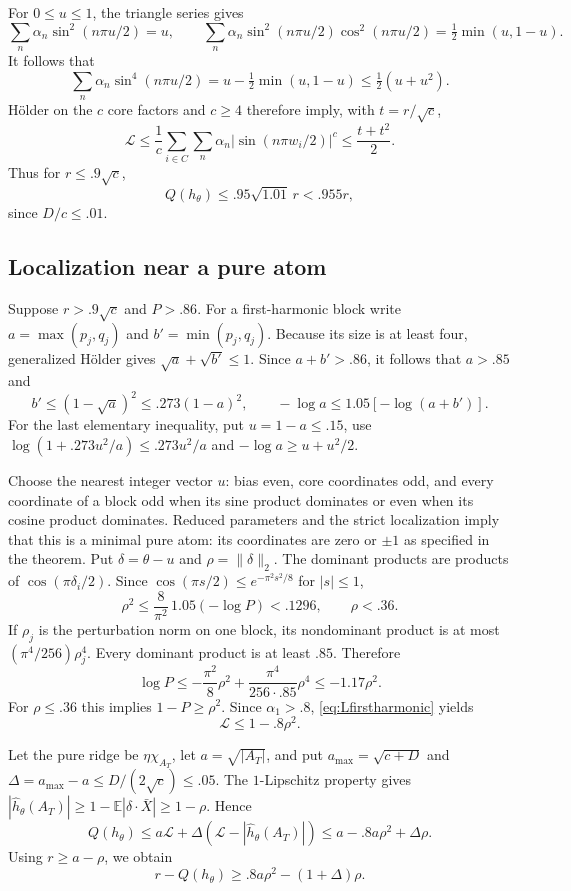 \documentclass[11pt]{article}
\newcommand{\E}{\mathbb E}
\begin{document}
For $0\le u\le1$, the triangle series gives
\[
 \sum_n\alpha_n\sin^2(n\pi u/2)=u,\qquad
 \sum_n\alpha_n\sin^2(n\pi u/2)\cos^2(n\pi u/2)
                  =\tfrac12\min(u,1-u).
\]
It follows that
\[
 \sum_n\alpha_n\sin^4(n\pi u/2)
    =u-\tfrac12\min(u,1-u)\le\tfrac12(u+u^2).
\]
H\"older on the $c$ core factors and $c\ge4$ therefore imply,
with $t=r/\sqrt c$,
\[
 \mathcal L\le\frac1c\sum_{i\in C}\sum_n\alpha_n
              |\sin(n\pi w_i/2)|^c\le\frac{t+t^2}{2}.
\]
Thus for $r\le.9\sqrt c$,
\begin{equation}\label{eq:lownormgap}
 Q(h_\theta)\le.95\sqrt{1.01}\,r<.955r,
\end{equation}
since $D/c\le.01$.

\subsection{Localization near a pure atom}

Suppose $r>.9\sqrt c$ and $P>.86$. For a first-harmonic block write
$a=\max(p_j,q_j)$ and $b'=\min(p_j,q_j)$. Because its size is at
least four, generalized H\"older gives
$\sqrt a+\sqrt{b'}\le1$. Since $a+b'>.86$, it follows that
$a>.85$ and
\[
 b'\le(1-\sqrt a)^2\le.273(1-a)^2,
 \qquad -\log a\le1.05[-\log(a+b')].
\]
For the last elementary inequality, put $u=1-a\le.15$, use
$\log(1+.273u^2/a)\le.273u^2/a$ and
$-\log a\ge u+u^2/2$.

Choose the nearest integer vector $u$: bias even, core coordinates
odd, and every coordinate of a block odd when its sine product
dominates or even when its cosine product dominates. Reduced
parameters and the strict localization imply that this is a minimal
pure atom: its coordinates are zero or $\pm1$ as specified in the
theorem. Put $\delta=\theta-u$ and $\rho=\|\delta\|_2$. The dominant
products are products of $\cos(\pi\delta_i/2)$. Since
$\cos(\pi s/2)\le e^{-\pi^2s^2/8}$ for $|s|\le1$,
\[
 \rho^2\le\frac8{\pi^2}\,1.05(-\log P)<.1296,
 \qquad \rho<.36.
\]
If $\rho_j$ is the perturbation norm on one block, its nondominant
product is at most $(\pi^4/256)\rho_j^4$. Every dominant product is
at least $.85$. Therefore
\[
 \log P\le-\frac{\pi^2}{8}\rho^2
          +\frac{\pi^4}{256\cdot.85}\rho^4
          \le-1.17\rho^2.
\]
For $\rho\le.36$ this implies $1-P\ge\rho^2$. Since
$\alpha_1>.8$, \eqref{eq:Lfirstharmonic} yields
\begin{equation}\label{eq:localquadratic}
 \mathcal L\le1-.8\rho^2.
\end{equation}

Let the pure ridge be $\eta\chi_{A_T}$, let $a=\sqrt{|A_T|}$, and
put $a_{\max}=\sqrt{c+D}$ and
$\Delta=a_{\max}-a\le D/(2\sqrt c)\le.05$.
The $1$-Lipschitz property gives
$|\widehat h_\theta(A_T)|\ge1-\E|\delta\cdot\bar X|\ge1-\rho$.
Hence
\[
 Q(h_\theta)\le a\mathcal L+
       \Delta(\mathcal L-|\widehat h_\theta(A_T)|)
       \le a-.8a\rho^2+\Delta\rho.
\]
Using $r\ge a-\rho$, we obtain
\begin{equation}\label{eq:quadraticdeficit}
 r-Q(h_\theta)\ge .8a\rho^2-(1+\Delta)\rho.
\end{equation}
\end{document}
